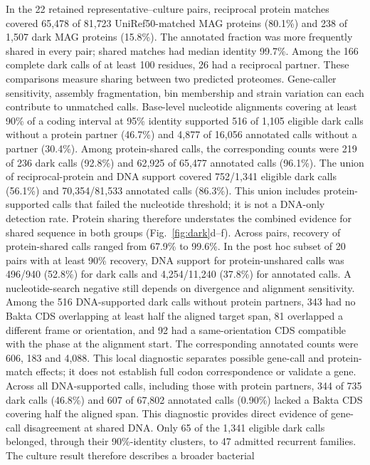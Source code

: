 \documentclass[11pt]{article}
\begin{document}
In the 22 retained representative--culture pairs, reciprocal protein matches covered 65{,}478
of 81{,}723 UniRef50-matched MAG proteins (80.1\%) and 238 of 1{,}507 dark MAG proteins (15.8\%).
The annotated fraction was more frequently shared in every pair; shared matches had median
identity 99.7\%. Among the 166 complete dark calls of at least 100 residues, 26 had a reciprocal
partner. These comparisons measure sharing between two predicted proteomes. Gene-caller
sensitivity, assembly fragmentation, bin membership and strain variation can each contribute to
unmatched calls. Base-level nucleotide alignments covering at least 90\% of a coding interval
at 95\% identity supported 516 of 1{,}105 eligible dark calls without a protein partner (46.7\%)
and 4{,}877 of 16{,}056 annotated calls without a partner (30.4\%). Among protein-shared calls,
the corresponding counts were 219 of 236 dark calls (92.8\%) and 62{,}925 of 65{,}477 annotated
calls (96.1\%). The union of reciprocal-protein and DNA support covered 752/1{,}341 eligible dark calls (56.1\%) and 70{,}354/81{,}533 annotated calls (86.3\%). This union includes protein-supported calls that failed the nucleotide threshold; it is not a DNA-only detection rate. Protein sharing therefore understates the combined evidence for shared sequence in both groups (Fig.~\ref{fig:dark}d--f). Across pairs, recovery of protein-shared calls ranged from 67.9\% to 99.6\%. In the post hoc subset of 20 pairs with at least 90\% recovery, DNA support for protein-unshared calls was 496/940 (52.8\%) for dark calls and 4{,}254/11{,}240 (37.8\%) for annotated calls.
A nucleotide-search negative still depends on divergence and alignment sensitivity.
Among the 516 DNA-supported dark calls without protein partners, 343 had no Bakta CDS
overlapping at least half the aligned target span, 81 overlapped a different frame or orientation,
and 92 had a same-orientation CDS compatible with the phase at the alignment start. The corresponding
annotated counts were 606, 183 and 4{,}088. This local diagnostic separates possible gene-call
and protein-match effects; it does not establish full codon correspondence or validate a gene.
Across all DNA-supported calls, including those with protein partners, 344 of 735 dark calls
(46.8\%) and 607 of 67{,}802 annotated calls (0.90\%) lacked a Bakta CDS covering half the aligned
span. This diagnostic provides direct evidence of gene-call disagreement at shared DNA.
Only 65 of the 1{,}341 eligible dark calls belonged, through their 90\%-identity clusters, to
47 admitted recurrent families. The culture result therefore describes a broader bacterial
\end{document}
